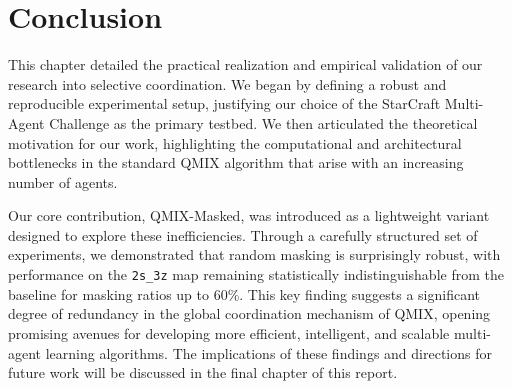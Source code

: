 \documentclass[../Main.tex]{subfiles}
\begin{document}
\section*{Conclusion}

This chapter detailed the practical realization and empirical validation of our research into selective coordination. We began by defining a robust and reproducible experimental setup, justifying our choice of the StarCraft Multi-Agent Challenge as the primary testbed. We then articulated the theoretical motivation for our work, highlighting the computational and architectural bottlenecks in the standard QMIX algorithm that arise with an increasing number of agents.

Our core contribution, QMIX-Masked, was introduced as a lightweight variant designed to explore these inefficiencies. Through a carefully structured set of experiments, we demonstrated that random masking is surprisingly robust, with performance on the \texttt{2s\_3z} map remaining statistically indistinguishable from the baseline for masking ratios up to 60\%. This key finding suggests a significant degree of redundancy in the global coordination mechanism of QMIX, opening promising avenues for developing more efficient, intelligent, and scalable multi-agent learning algorithms. The implications of these findings and directions for future work will be discussed in the final chapter of this report.
\end{document}
